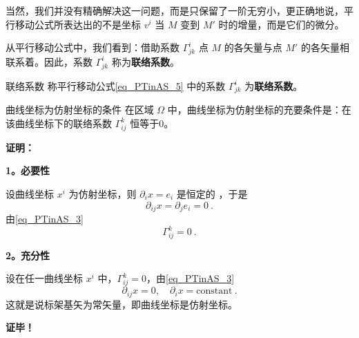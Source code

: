 当然，我们并没有精确解决这一问题，而是只保留了一阶无穷小，更正确地说，平行移动公式所表达出的不是坐标 $v^i$ 当 $M$ 变到 $M'$ 时的增量，而是它们的微分。

从平行移动公式中，我们看到：借助系数 $\Gamma^i_{jk}$ 点 $M$ 的各矢量与点 $M'$ 的各矢量相联系着。因此，系数 $\Gamma^i_{jk}$ 称为\textbf{联络系数}。
\begin{definition}{联络系数}
称平行移动公式\autoref{eq_PTinAS_5} 中的系数 $\Gamma^i_{jk}$ 为\textbf{联络系数}。
\end{definition}
\begin{theorem}{曲线坐标为仿射坐标的条件}
在区域 $\Omega$ 中，曲线坐标为仿射坐标的充要条件是：在该曲线坐标下的联络系数 $\Gamma^k_{ij}$ 恒等于0。
\end{theorem}
\textbf{证明：}

\textbf{1。必要性}

设曲线坐标 $x^i$ 为仿射坐标，则 $\partial_i x=e_i$ 是恒定的 ，于是
\begin{equation}
\partial_{ij} x=\partial_j e_i=0~.
\end{equation}
由\autoref{eq_PTinAS_3} 
\begin{equation}
\Gamma^k_{ij}=0~.
\end{equation}

\textbf{2。充分性}

设在任一曲线坐标 $x^i$ 中，$\Gamma^k_{ij}=0$，由\autoref{eq_PTinAS_3} 
\begin{equation}
\partial_{ij}x=0,\quad \partial_i x=\mathrm{constant}~.
\end{equation}
这就是说标架基矢为常矢量，即曲线坐标是仿射坐标。

\textbf{证毕！}
